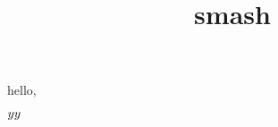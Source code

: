 \documentclass{amsart}
\title{smash}
\begin{document}
\maketitle

hello, 

$y\smash{y}$
\end{document}
